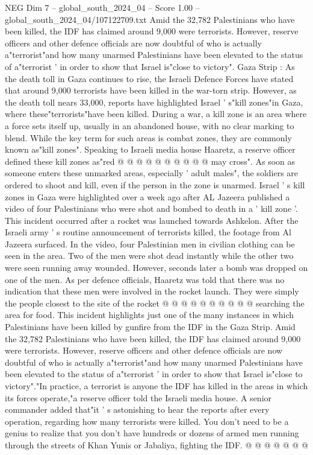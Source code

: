 \begin{textsample}{NEG Dim 7 – global\_south\_2024\_04 – Score 1.00 – global\_south\_2024\_04/107122709.txt}  \label{ex:f7_neg_282}
Amid the 32,782 Palestinians who have been killed, the IDF has claimed around 9,000 were terrorists.
However, reserve officers and other defence officials are now doubtful of who is actually a"terrorist"and how many unarmed Palestinians have been elevated to the status of a"terrorist ' in order to show that Israel is"close to victory".
Gaza Strip : As the death toll in Gaza continues to rise, the Israeli Defence Forces have stated that around 9,000 terrorists have been killed in the war-torn strip.
However, as the death toll nears 33,000, reports have highlighted Israel ' s"kill zones"in Gaza, where these"terrorists"have been killed.
During a war, a kill zone is an area where a force sets itself up, usually in an abandoned house, with no clear marking to blend.
While the key term for such areas is combat zones, they are commonly known as"kill zones".
Speaking to Israeli media house Haaretz, a reserve officer defined these kill zones as"red @ @ @ @ @ @ @ @ @ @ may cross".
As soon as someone enters these unmarked areas, especially ' adult males", the soldiers are ordered to shoot and kill, even if the person in the zone is unarmed.
Israel ' s kill zones in Gaza were highlighted over a week ago after AL Jazeera published a video of four Palestinians who were shot and bombed to death in a ' kill zone '.
This incident occurred after a rocket was launched towards Ashkelon.
After the Israeli army ' s routine announcement of terrorists killed, the footage from Al Jazeera surfaced.
In the video, four Palestinian men in civilian clothing can be seen in the area.
Two of the men were shot dead instantly while the other two were seen running away wounded.
However, seconds later a bomb was dropped on one of the men.
As per defence officials, Haaretz was told that there was no indication that these men were involved in the rocket launch.
They were simply the people closest to the site of the rocket @ @ @ @ @ @ @ @ @ @ searching the area for food.
This incident highlights just one of the many instances in which Palestinians have been killed by gunfire from the IDF in the Gaza Strip.
Amid the 32,782 Palestinians who have been killed, the IDF has claimed around 9,000 were terrorists.
However, reserve officers and other defence officials are now doubtful of who is actually a"terrorist"and how many unarmed Palestinians have been elevated to the status of a"terrorist ' in order to show that Israel is"close to victory"."In practice, a terrorist is anyone the IDF has killed in the areas in which its forces operate,"a reserve officer told the Israeli media house.
A senior commander added that"it ' s astonishing to hear the reports after every operation, regarding how many terrorists were killed.
You don't need to be a genius to realize that you don't have hundreds or dozens of armed men running through the streets of Khan Yunis or Jabaliya, fighting the IDF. @ @ @ @ @ @ @

\end{textsample}
